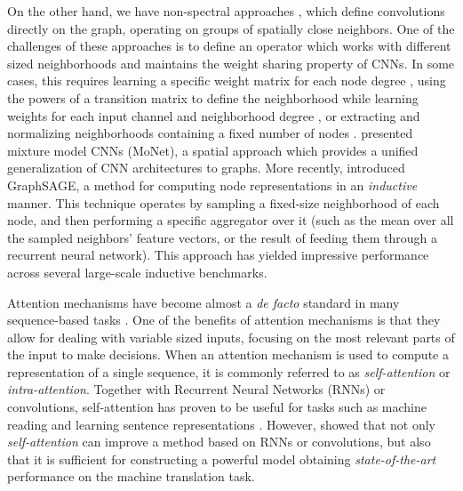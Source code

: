 \documentclass{article} %
\begin{document}
On the other hand, we have non-spectral approaches \citep{duvenaud2015convolutional, atwood2016diffusion, hamilton2017inductive}, which define convolutions directly on the graph, operating on groups of spatially close neighbors. One of the challenges of these approaches is to define an operator which works with different sized neighborhoods and maintains the weight sharing property of CNNs. In some cases, this requires learning a specific weight matrix for each node degree \citep{duvenaud2015convolutional}, using the powers of a transition matrix to define the neighborhood while learning weights for each input channel and neighborhood degree \citep{atwood2016diffusion}, or extracting and normalizing neighborhoods containing a fixed number of nodes \citep{niepert16}. \cite{monti2016geometric} presented mixture model CNNs (MoNet), a spatial approach which provides a unified generalization of CNN architectures to graphs. More recently, \cite{hamilton2017inductive} introduced GraphSAGE, a method for computing node representations in an \textit{inductive} manner. This technique operates by sampling a fixed-size neighborhood of each node, and then performing a specific aggregator over it (such as the mean over all the sampled neighbors' feature vectors, or the result of feeding them through a recurrent neural network). This approach has yielded impressive performance across several large-scale inductive benchmarks.

Attention mechanisms have become almost a \emph{de facto} standard in many sequence-based tasks \citep{bahdanau2014neural,GehringAGD16}. One of the benefits of attention mechanisms is that they allow for dealing with variable sized inputs, focusing on the most relevant parts of the input to make decisions. When an attention mechanism is used to compute a representation of a single sequence, it is commonly referred to as \emph{self-attention} or \emph{intra-attention}. Together with Recurrent Neural Networks (RNNs) or convolutions, self-attention has proven to be useful for tasks such as machine reading \citep{cheng2016long} and learning sentence representations \citep{lin2017structured}. However, \cite{vaswani2017attention} showed that not only \emph{self-attention} can improve a method based on RNNs or convolutions, but also that it is sufficient for constructing a powerful model obtaining \emph{state-of-the-art} performance on the machine translation task. 
\end{document}
